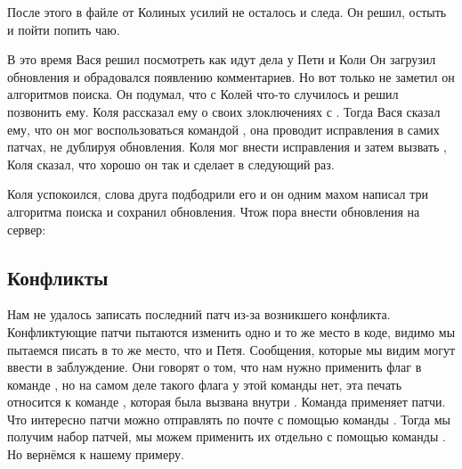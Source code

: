 После этого в файле  от Колиных усилий не осталось
и следа. Он решил, остыть и пойти попить чаю. 

В это время Вася решил посмотреть как идут дела у Пети и Коли
Он загрузил обновления 
и обрадовался появлению комментариев. Но вот только не
заметил он алгоритмов поиска. Он подумал, что с Колей что-то
случилось и решил позвонить ему. Коля рассказал ему о своих
злоключениях с . Тогда Вася сказал ему, что 
он мог воспользоваться командой ,
она проводит исправления в самих патчах, не дублируя 
обновления. Коля мог внести исправления и затем
вызвать , Коля сказал, что хорошо он так
и сделает в следующий раз.

Коля успокоился, слова друга подбодрили его и он 
одним махом написал три алгоритма поиска и сохранил 
обновления. Чтож пора внести обновления на сервер:


\subsection{Конфликты}

Нам не удалось записать последний патч из-за возникшего
конфликта. Конфликтующие патчи пытаются изменить одно и
то же место в коде, видимо мы пытаемся писать в то же место,
что и Петя. Сообщения, которые мы видим могут ввести в 
заблуждение. Они говорят о том, что нам нужно применить флаг
 в команде , но на самом деле 
такого флага у этой команды нет, эта печать относится 
к команде , которая была вызвана внутри .
Команда  применяет патчи. Что интересно патчи
можно отправлять по почте с помощью команды .
Тогда мы получим набор патчей, мы можем применить их отдельно
с помощью команды . Но вернёмся к нашему примеру. 

